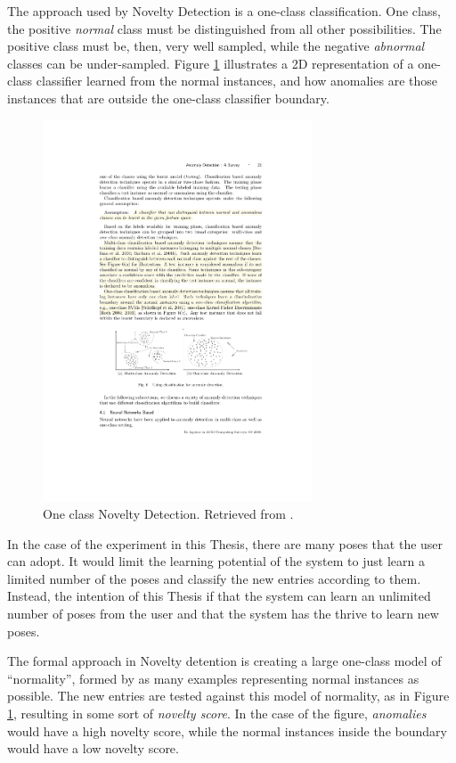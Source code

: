 The approach used by Novelty Detection is a one-class classification. One class, the positive \emph{normal} class must be distinguished from all other possibilities. The positive class must be, then, very well sampled, while the negative \emph{abnormal} classes can be under-sampled. Figure \ref{fig:one} illustrates a 2D representation of a one-class classifier learned from the normal instances, and how anomalies are those instances that are outside the one-class classifier boundary.

\begin{figure}[h]
\includegraphics[width=8cm]{Figures/Oneclass}
\centering
\caption[One class Novelty Detection]{One class Novelty Detection. Retrieved from \citeauthor{Chandola2009} \cite{Chandola2009}. \label{fig:one}}
\end{figure}

In the case of the experiment in this Thesis, there are many poses that the user can adopt. It would limit the learning potential of the system to just learn a limited number of the poses and classify the new entries according to them. Instead, the intention of this Thesis if that the system can learn an unlimited number of poses from the user and that the system has the thrive to learn new poses.

The formal approach in Novelty detention is creating a large one-class model of “normality”, formed by as many examples representing normal instances as possible. The new entries are tested against this model of normality, as in Figure \ref{fig:one}, resulting in some sort of \emph{novelty score}. In the case of the figure, \emph{anomalies} would have a high novelty score, while the normal instances inside the boundary would have a low novelty score.

